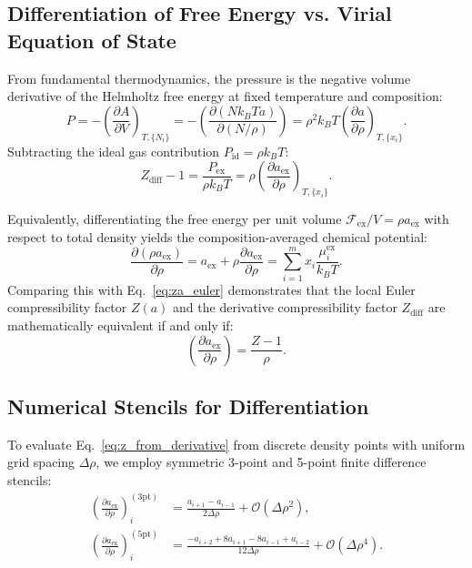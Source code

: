 \documentclass[11pt,a4paper]{article}
\begin{document}
\subsection{Differentiation of Free Energy vs. Virial Equation of State}

From fundamental thermodynamics, the pressure is the negative volume derivative of the Helmholtz free energy at fixed temperature and composition:
\begin{equation}
P = -\left(\frac{\partial A}{\partial V}\right)_{T, \{N_i\}} = -\left(\frac{\partial (N k_B T a)}{\partial (N/\rho)}\right) = \rho^2 k_B T \left(\frac{\partial a}{\partial \rho}\right)_{T, \{x_i\}}.
\end{equation}
Subtracting the ideal gas contribution $P_{\text{id}} = \rho k_B T$:
\begin{equation}
\label{eq:z_from_derivative}
Z_{\text{diff}} - 1 = \frac{P_{\text{ex}}}{\rho k_B T} = \rho \left( \frac{\partial a_{\text{ex}}}{\partial \rho} \right)_{T, \{x_i\}}.
\end{equation}

Equivalently, differentiating the free energy per unit volume $\mathcal{F}_{\text{ex}} / V = \rho a_{\text{ex}}$ with respect to total density yields the composition-averaged chemical potential:
\begin{equation}
\frac{\partial (\rho a_{\text{ex}})}{\partial \rho} = a_{\text{ex}} + \rho \frac{\partial a_{\text{ex}}}{\partial \rho} = \sum_{i=1}^{m} x_i \frac{\mu_i^{\text{ex}}}{k_B T}.
\end{equation}
Comparing this with Eq.~\eqref{eq:za_euler} demonstrates that the local Euler compressibility factor $Z(a)$ and the derivative compressibility factor $Z_{\text{diff}}$ are mathematically equivalent if and only if:
\begin{equation}
\left( \frac{\partial a_{\text{ex}}}{\partial \rho} \right) = \frac{Z - 1}{\rho}.
\end{equation}

\subsection{Numerical Stencils for Differentiation}

To evaluate Eq.~\eqref{eq:z_from_derivative} from discrete density points with uniform grid spacing $\Delta\rho$, we employ symmetric 3-point and 5-point finite difference stencils:
\begin{align}
\left( \frac{\partial a_{\text{ex}}}{\partial \rho} \right)_i^{(3\text{pt})} &= \frac{a_{i+1} - a_{i-1}}{2 \Delta\rho} + \mathcal{O}(\Delta\rho^2), \\
\left( \frac{\partial a_{\text{ex}}}{\partial \rho} \right)_i^{(5\text{pt})} &= \frac{-a_{i+2} + 8 a_{i+1} - 8 a_{i-1} + a_{i-2}}{12 \Delta\rho} + \mathcal{O}(\Delta\rho^4).
\end{align}
\end{document}
